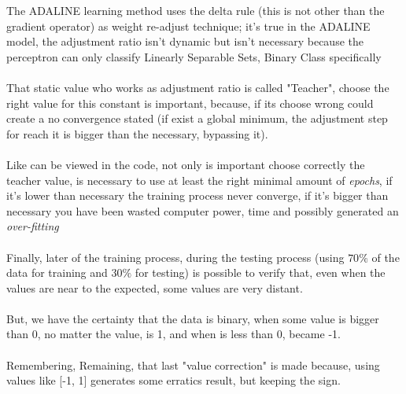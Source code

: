 \documentclass[10pt,a4paper]{report}
\begin{document}
	The ADALINE learning method uses the delta rule (this is not other than the gradient operator) as weight re-adjust technique; it's true in the ADALINE model, the adjustment ratio isn't dynamic but isn't necessary because the perceptron can only classify Linearly Separable Sets, Binary Class specifically
	\\
	\\
	That static value who works as adjustment ratio is called "Teacher",  choose the right value for this constant is important, because, if its choose wrong could create a no convergence stated (if exist a global minimum, the adjustment step for reach it is bigger than the necessary, bypassing it).
	\\
	\\
	Like can be viewed in the code, not only is important choose correctly the teacher value, is necessary to use at least the right minimal amount of \textit{epochs}, if it's lower than necessary the training process never converge, if it's bigger than necessary you have been wasted computer power, time and possibly generated an \textit{over-fitting}
	\\
	\\
    Finally, later of the training process, during the testing process (using $70\%$ of the data for training and $30\%$ for testing) is possible to verify that, even when the values are near to the expected, some values are very distant.
	\\
	\\
	But, we have the certainty that the data is binary,  when some value is bigger than 0, no matter the value, is 1, and when is less than 0,  became -1.
	\\
	\\
	Remembering, Remaining, that last "value correction" is made because, using values like [-1, 1] generates some erratics result, but keeping the sign.
	
\end{document}
